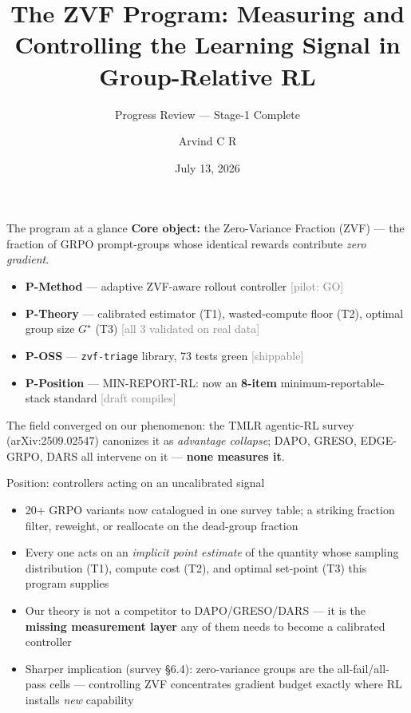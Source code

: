 \documentclass[aspectratio=169,11pt]{beamer}
\title[ZVF Program Review]{The ZVF Program: Measuring and Controlling the
Learning Signal in Group-Relative RL}
\subtitle{Progress Review — Stage-1 Complete}
\author{Arvind C R}
\institute{PES University}
\date{July 13, 2026}
\newcommand{\tier}[1]{\hfill{\scriptsize\textcolor{gray}{[#1]}}}
\begin{document}
\begin{frame}
  \titlepage
\end{frame}

\begin{frame}{The program at a glance}
  \textbf{Core object:} the Zero-Variance Fraction (ZVF) --- the fraction of
  GRPO prompt-groups whose identical rewards contribute \emph{zero gradient}.
  \vspace{4pt}
  \begin{itemize}
    \item \textbf{P-Method} — adaptive ZVF-aware rollout controller
          \tier{pilot: GO}
    \item \textbf{P-Theory} — calibrated estimator (T1), wasted-compute floor
          (T2), optimal group size $G^\star$ (T3) \tier{all 3 validated on real data}
    \item \textbf{P-OSS} — \texttt{zvf-triage} library, 73 tests green
          \tier{shippable}
    \item \textbf{P-Position} — MIN-REPORT-RL: now an \textbf{8-item}
          minimum-reportable-stack standard \tier{draft compiles}
  \end{itemize}
  \vspace{4pt}
  The field converged on our phenomenon: the TMLR agentic-RL survey
  (arXiv:2509.02547) canonizes it as \emph{advantage collapse}; DAPO, GRESO,
  EDGE-GRPO, DARS all intervene on it --- \textbf{none measures it}.
\end{frame}

\begin{frame}{Position: controllers acting on an uncalibrated signal}
  \begin{itemize}
    \item 20+ GRPO variants now catalogued in one survey table; a striking
          fraction filter, reweight, or reallocate on the dead-group fraction
    \item Every one acts on an \emph{implicit point estimate} of the quantity
          whose sampling distribution (T1), compute cost (T2), and optimal
          set-point (T3) this program supplies
    \item Our theory is not a competitor to DAPO/GRESO/DARS --- it is the
          \textbf{missing measurement layer} any of them needs to become a
          calibrated controller
    \item Sharper implication (survey \S6.4): zero-variance groups are the
          all-fail/all-pass cells --- controlling ZVF concentrates gradient
          budget exactly where RL installs \emph{new} capability
  \end{itemize}
\end{frame}
\end{document}
